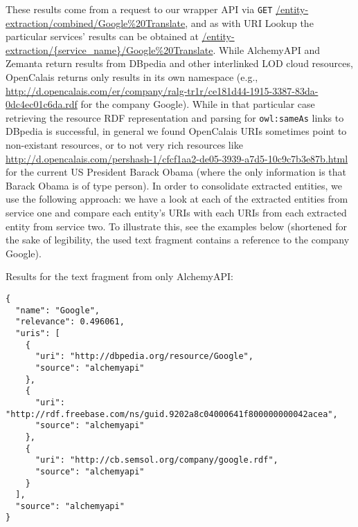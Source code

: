 \documentclass{acm_proc_article-sp}
\begin{document}
These results come from a request to our wrapper API via \texttt{GET} \url{/entity-extraction/combined/Google%20Translate}, and as with URI Lookup the particular services' results can be obtained at \url{/entity-extraction/{service_name}/Google%

Results for the text fragment from only AlchemyAPI:
\begin{lstlisting}
{
  "name": "Google",
  "relevance": 0.496061,
  "uris": [
    {
      "uri": "http://dbpedia.org/resource/Google",
      "source": "alchemyapi" 
    },
    {
      "uri": "http://rdf.freebase.com/ns/guid.9202a8c04000641f800000000042acea",
      "source": "alchemyapi" 
    },
    {
      "uri": "http://cb.semsol.org/company/google.rdf",
      "source": "alchemyapi" 
    } 
  ],
  "source": "alchemyapi" 
}
\end{lstlisting}
\end{document}
